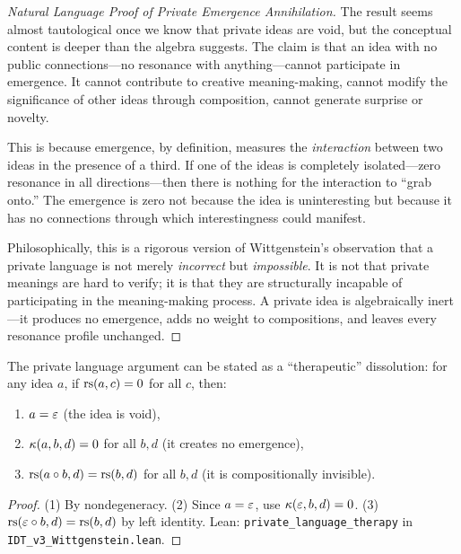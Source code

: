 \begin{proof}[Natural Language Proof of Private Emergence Annihilation]
The result seems almost tautological once we know that private ideas are void,
but the conceptual content is deeper than the algebra suggests. The claim is
that an idea with no public connections---no resonance with anything---cannot
participate in emergence. It cannot contribute to creative meaning-making,
cannot modify the significance of other ideas through composition, cannot
generate surprise or novelty.

This is because emergence, by definition, measures the \emph{interaction}
between two ideas in the presence of a third. If one of the ideas is
completely isolated---zero resonance in all directions---then there is nothing
for the interaction to ``grab onto.'' The emergence is zero not because the
idea is uninteresting but because it has no connections through which
interestingness could manifest.

Philosophically, this is a rigorous version of Wittgenstein's observation that
a private language is not merely \emph{incorrect} but \emph{impossible}. It is
not that private meanings are hard to verify; it is that they are structurally
incapable of participating in the meaning-making process. A private idea is
algebraically inert---it produces no emergence, adds no weight to compositions,
and leaves every resonance profile unchanged.
\end{proof}

\begin{theorem}
\label{thm:private-therapy}
The private language argument can be stated as a ``therapeutic'' dissolution:
for any idea $a$, if $\mathrm{rs}(a, c) = 0$ for all $c$, then:
\begin{enumerate}
\item $a = \varepsilon$ (the idea is void),
\item $\kappa(a, b, d) = 0$ for all $b, d$ (it creates no emergence),
\item $\mathrm{rs}(a \circ b, d) = \mathrm{rs}(b, d)$ for all $b, d$ (it is compositionally invisible).
\end{enumerate}
\end{theorem}

\begin{proof}
(1) By nondegeneracy. (2) Since $a = \varepsilon$, use $\kappa(\varepsilon, b, d) = 0$.
(3) $\mathrm{rs}(\varepsilon \circ b, d) = \mathrm{rs}(b, d)$ by left identity.
Lean: \texttt{private\_language\_therapy} in \texttt{IDT\_v3\_Wittgenstein.lean}.
\end{proof}

